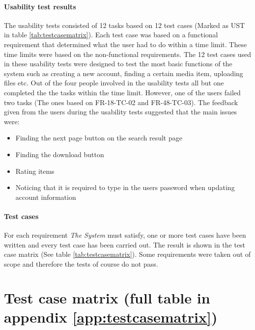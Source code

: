 \documentclass[../report.tex]{subfiles}
\begin{document}
\paragraph{Usability test results}
The usability tests consisted of 12 tasks based on 12 test cases (Marked as UST in table \ref{tab:testcasematrix}). Each test case was based on a functional requirement that determined what the user had to do within a time limit. These time limits were based on the non-functional requirements. The 12 test cases used in these usability tests were designed to test the most basic functions of the system such as creating a new account, finding a certain media item, uploading files etc. 
Out of the four people involved in the usability tests all but one completed the the tasks within the time limit. However, one of the users failed two tasks (The ones based on FR-18-TC-02 and FR-48-TC-03). The feedback given from the users during the usability tests suggested that the main issues were:
\begin{itemize}
\item Finding the next page button on the search result page
\item Finding the download button
\item Rating items
\item Noticing that it is required to type in the users password when updating account information
\end{itemize} 

\paragraph{Test cases}
For each requirement \textit{The System} must satisfy, one or more test cases have been written and every test case has been carried out. The result is shown in the test case matrix (See table \ref{tab:testcasematrix}). Some requirements were taken out of scope and therefore the tests of course do not pass.


\section{Test case matrix (full table in appendix \ref{app:testcasematrix})}
\end{document}
